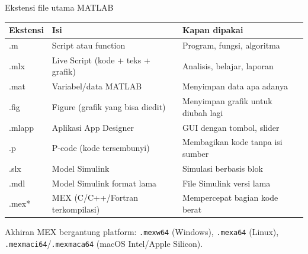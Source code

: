 \documentclass[10pt,aspectratio=169]{beamer}
\newcommand{\kode}[1]{\texttt{\small #1}}
\begin{document}
\begin{frame}{Ekstensi file utama MATLAB}
  \centering\small
  \begin{tabular}{>{\ttfamily}l l l}
    \toprule
    \textrm{\textbf{Ekstensi}} & \textbf{Isi} & \textbf{Kapan dipakai} \\
    \midrule
    .m      & Script atau function           & Program, fungsi, algoritma \\
    .mlx    & Live Script (kode + teks + grafik) & Analisis, belajar, laporan \\
    .mat    & Variabel/data MATLAB           & Menyimpan data apa adanya \\
    .fig    & Figure (grafik yang bisa diedit) & Menyimpan grafik untuk diubah lagi \\
    .mlapp  & Aplikasi App Designer          & GUI dengan tombol, slider \\
    .p      & P-code (kode tersembunyi)      & Membagikan kode tanpa isi sumber \\
    .slx    & Model Simulink                 & Simulasi berbasis blok \\
    .mdl    & Model Simulink format lama     & File Simulink versi lama \\
    .mex*   & MEX (C/C++/Fortran terkompilasi) & Mempercepat bagian kode berat \\
    \bottomrule
  \end{tabular}

  \vspace{0.6em}
  \raggedright\footnotesize
  Akhiran MEX bergantung platform: \kode{.mexw64} (Windows), \kode{.mexa64} (Linux), \kode{.mexmaci64}/\kode{.mexmaca64} (macOS Intel/Apple Silicon).
\end{frame}
\end{document}
